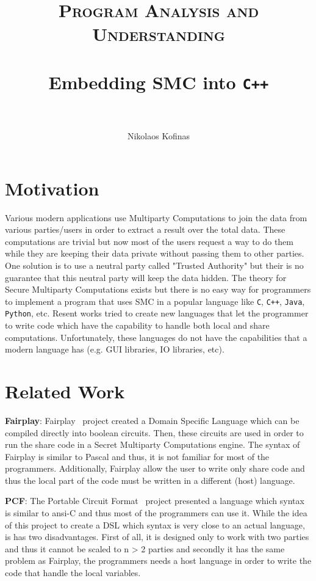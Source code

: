 \documentclass[paper=a4, fontsize=11pt]{scrartcl} %
\title{	
\vspace*{-2cm}
\normalfont \normalsize 
\textsc{Program Analysis and Understanding} \\ [10pt] %
\horrule{0.2pt} \\[0.2cm] %
\huge Embedding SMC into {\tt C++} \\ %
\horrule{2pt} \\[0.2cm] %
}
\author{Nikolaos Kofinas} %
\date{}%
\numberwithin{equation}{section} %
\numberwithin{figure}{section} %
\numberwithin{table}{section} %
\begin{document}
\maketitle %

\section{Motivation}

Various modern applications use Multiparty Computations to join the data from various parties/users in order to extract a result over the total data. These computations are trivial but now most of the users request a way to do them while they are keeping their data private without passing them to other parties. One solution is to use a neutral party called "Trusted Authority" but their is no guarantee that this neutral party will keep the data hidden. The theory for Secure Multiparty Computations exists but there is no easy way for programmers to implement a program that uses SMC in a popular language like {\tt C}, {\tt C++}, {\tt Java}, {\tt Python}, etc. Resent works tried to create new languages that let the programmer to write code which have the capability to handle both local and share computations. Unfortunately, these languages do not have the capabilities that a modern language has (e.g. GUI libraries, IO libraries, etc).
\section{Related Work}

\noindent
\textbf{Fairplay}: Fairplay~\cite{Fairplay} project created a Domain Specific Language which can be compiled directly into boolean circuits. Then, these circuits are used in order to run the share code in a Secret Multiparty Computations engine. The syntax of Fairplay is similar to Pascal and thus, it is not familiar for most of the programmers. Additionally, Fairplay allow the user to write only share code and thus the local part of the code must be written in a different (host) language. 

\noindent
\textbf{PCF}: The Portable Circuit Format~\cite{Ansi-c} project presented a language which syntax is similar to ansi-C and thus most of the programmers can use it. While the idea of this project to create a DSL which syntax is very close to an actual language, is has two disadvantages. First of all, it is designed only to work with two parties and thus it cannot be scaled to n > 2 parties and secondly it has the same problem as Fairplay, the programmers needs a host language in order to write the code that handle the local variables.
\end{document}

